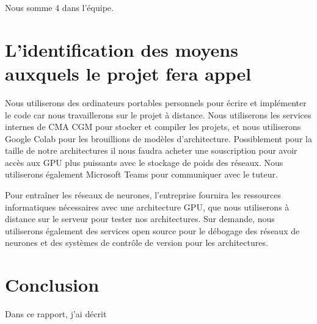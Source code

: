 \documentclass[a4paper,12pt]{article}
\begin{document}
Nous somme 4 dans l'équipe. 


\section{L'identification des moyens auxquels le projet fera appel}

Nous utiliserons des ordinateurs portables personnels pour écrire et implémenter le code car nous travaillerons sur le projet à distance. Nous utiliserons les services internes de CMA CGM pour stocker et compiler les projets, et nous utiliserons Google Colab pour les brouillions de modèles d'architecture. Possiblement pour la taille de notre architectures il nous faudra acheter une souscription pour avoir accès aux GPU plus puissants avec le stockage de poids des réseaux. Nous utiliserons également Microsoft Teams pour communiquer avec le tuteur.

Pour entraîner les réseaux de neurones, l'entreprise fournira les ressources informatiques nécessaires avec une architecture GPU, que nous utiliserons à distance sur le serveur pour tester nos architectures. Sur demande, nous utiliserons également des services open source pour le débogage des réseaux de neurones et des systèmes de contrôle de version pour les architectures.

	
\section{Conclusion}

Dans ce rapport, j'ai décrit 
\end{document}
